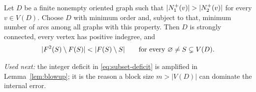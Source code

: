 \begin{lemma}
\label{lem:subset-deficit}
Let $D$ be a finite nonempty oriented graph such that
$\lvert N_1^+(v)\rvert>\lvert N_2^+(v)\rvert$ for every $v\in V(D)$.
Choose $D$ with minimum order and, subject to that, minimum number of
arcs among all graphs with this property.  Then $D$ is strongly connected,
every vertex has positive indegree, and
\begin{equation}
\label{eq:subset-deficit}
  \lvert F^2(S)\setminus F(S)\rvert<\lvert F(S)\setminus S\rvert
  \qquad\text{for every }\varnothing\ne S\subsetneq V(D).
\end{equation}
\end{lemma}

\noindent\emph{Used next:} the integer deficit in
\eqref{eq:subset-deficit} is amplified in Lemma~\ref{lem:blowup}; it is the
reason a block size $m>|V(D)|$ can dominate the internal error.

